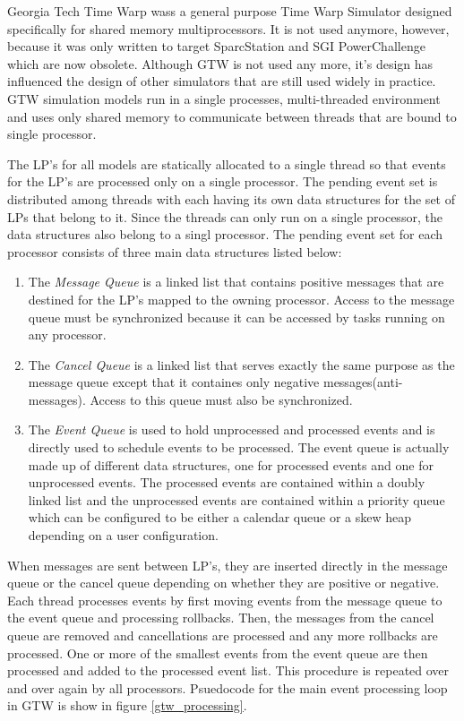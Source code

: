 \documentclass[11pt]{book}
\begin{document}
Georgia Tech Time Warp wass a general purpose Time Warp Simulator designed specifically for
shared memory multiprocessors. It is not used anymore, however, because it was only written
to target SparcStation and SGI PowerChallenge which are now obsolete. Although GTW is not
used any more, it's design has influenced the design of other simulators that are still used
widely in practice. GTW simulation models run in a single processes, multi-threaded environment
and uses only shared memory to communicate between threads that are bound to single processor.

The LP's for all models are statically allocated to a single thread so that events for the
LP's are processed only on a single processor. The pending event set is distributed among
threads with each having its own data structures for the set of LPs that belong to it.
Since the threads can only run on a single processor, the data structures also belong to a
singl processor. The pending event set for each processor consists of three main data structures
listed below\cite{das-94}:

\begin{enumerate}
    \item The \emph{Message Queue} is a linked list that contains positive messages that
        are destined for the LP's mapped to the owning processor. Access to the message
        queue must be synchronized because it can be accessed by tasks running on any processor.
    \item The \emph{Cancel Queue} is a linked list that serves exactly the same purpose as
        the message queue except that it containes only negative messages(anti-messages).
        Access to this queue must also be synchronized.
    \item The \emph{Event Queue} is used to hold unprocessed and processed events and is
        directly used to schedule events to be processed. The event queue is actually made
        up of different data structures, one for processed events and one for unprocessed
        events. The processed events are contained within a doubly linked list and the
        unprocessed events are contained within a priority queue which can be configured to
        be either a calendar queue or a skew heap depending on a user configuration.
\end{enumerate}

\noindent
When messages are sent between LP's, they are inserted directly in the message queue or
the cancel queue depending on whether they are positive or negative. Each thread processes events
by first moving events from the message queue to the event queue and processing rollbacks. Then,
the messages from the cancel queue are removed and cancellations are processed and any more
rollbacks are processed. One or more of the smallest events from the event queue are then processed
and added to the processed event list. This procedure is repeated over and over again by all processors.
Psuedocode for the main event processing loop in GTW is show in figure \ref{gtw_processing}.
\end{document}
